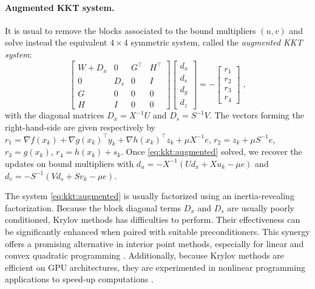\paragraph{Augmented KKT system.}
It is usual to remove the blocks associated
to the bound multipliers $(u, v)$ and solve instead the equivalent
$4 \times 4$ symmetric system, called the \emph{augmented KKT system}:
\begin{equation}
  \label{eq:kkt:augmented}
  \tag{$K_2$}
  \begin{bmatrix}
    W + D_x & 0   & G^\top           & H^\top           \\
    0       & D_s & 0\phantom{^\top} & I\phantom{^\top} \\
    G       & 0   & 0\phantom{^\top} & 0\phantom{^\top} \\
    H       & I   & 0\phantom{^\top} & 0\phantom{^\top}
  \end{bmatrix}
  \begin{bmatrix}
    d_x \\
    d_s \\
    d_y \\
    d_z
  \end{bmatrix}
  = - \begin{bmatrix}
    r_1 \\ r_2 \\ r_3 \\ r_4
  \end{bmatrix} \; ,
\end{equation}
with the diagonal matrices $D_x = X^{-1} U$ and $D_s = S^{-1} V$.
The vectors forming the right-hand-side are given respectively by
$r_1 = \nabla f(x_k) + \nabla g(x_k)^\top y_k + \nabla h(x_k)^\top z_k + \mu X^{-1} e$,
$r_2 = z_k + \mu S^{-1} e$,
$r_3 = g(x_k)$,
$r_4 = h(x_k) + s_k$.
Once \eqref{eq:kkt:augmented} solved, we recover the updates on bound multipliers with
$d_u = - X^{-1}(U d_x + X u_k - \mu e)$ and
$d_v = - S^{-1}(V d_s + S v_k - \mu e)$.

The system \eqref{eq:kkt:augmented} is usually factorized using
an inertia-revealing \lblt factorization.
Because the block diagonal terms
$D_x$ and $D_s$ are usually poorly conditioned, Krylov methods has difficulties to perform.
Their effectiveness can be significantly enhanced when paired with suitable preconditioners.
This synergy offers a promising alternative in interior point methods, especially for linear and convex quadratic programming \cite{gondzio-2012}. Additionally, because Krylov methods are efficient on GPU architectures, they are experimented in nonlinear programming applications to speed-up computations \cite{cao-seth-laird-2016}.

